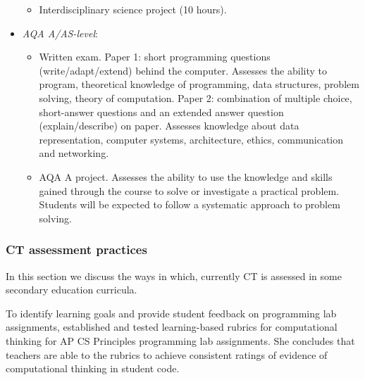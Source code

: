 \begin{itemize}
\begin{itemize}
    \item Interdisciplinary science project (10 hours).
    \end{itemize}



\item \emph{AQA A/AS-level}:
    \begin{itemize}
    \item Written exam. Paper 1: short programming questions (write/adapt/extend) behind the computer. Assesses the ability to program, theoretical knowledge of programming, data structures, problem solving, theory of computation. Paper 2: combination of multiple choice, short-answer questions and an extended answer question (explain/describe) on paper. Assesses knowledge about data representation, computer systems, architecture, ethics, communication and networking.
    \item AQA A project. Assesses the ability to use the knowledge and skills gained through the course to solve or investigate a practical problem. Students will be expected to follow a systematic approach to problem solving.

    \end{itemize}

\end{itemize}




\subsubsection{CT assessment practices}

In this section we discuss the ways in which, currently CT is assessed in some secondary education curricula.

To identify learning goals and provide student feedback on programming lab assignments,  established and tested learning-based rubrics for computational thinking for AP CS Principles programming lab assignments. She concludes that teachers are able to the rubrics to achieve consistent ratings of evidence of computational thinking in student code.

